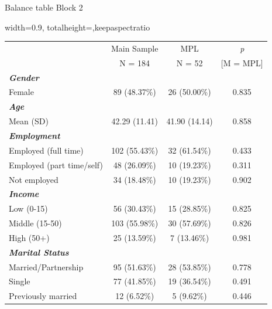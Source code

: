 \documentclass[aspectratio=169,xcolor=dvipsnames]{beamer}
\begin{document}
\begin{frame}{Balance table Block 2}
  \begin{table}
    \begin{adjustbox}{width=0.9\textwidth, totalheight=\baselineskip,keepaspectratio}
      \centering
      \begin{threeparttable}
        \begin{tabular*}{\textwidth}{@{\extracolsep{\fill}}lcc c@{}}
          \toprule
          & \multicolumn{1}{c}{Main Sample} & \multicolumn{1}{c}{MPL} & \multicolumn{1}{c}{\textit{p}} \\
          & \multicolumn{1}{c}{N = 184} & \multicolumn{1}{c}{N = 52} & [M = MPL]\\
          \midrule
          \textit{\textbf{Gender}} & & & \\
          Female & 89 (48.37\%) & 26 (50.00\%) & 0.835 \\ \midrule
          \textit{\textbf{Age}} & & & \\
          Mean (SD) & 42.29 (11.41) & 41.90 (14.14) & 0.858 \\ \midrule
          \textit{\textbf{Employment}} & & & \\
          Employed (full time) & 102 (55.43\%) & 32 (61.54\%) & 0.433 \\
          Employed (part time/self) & 48 (26.09\%) & 10 (19.23\%) & 0.311 \\
          Not employed & 34 (18.48\%) & 10 (19.23\%) & 0.902 \\ \midrule
          \textit{\textbf{Income}} & & & \\
          Low (0-15) & 56 (30.43\%) & 15 (28.85\%) & 0.825 \\
          Middle (15-50) & 103 (55.98\%) & 30 (57.69\%) & 0.826 \\
          High (50+) & 25 (13.59\%) & 7 (13.46\%) & 0.981 \\ \midrule
          \textit{\textbf{Marital Status}} & & & \\
          Married/Partnership & 95 (51.63\%) & 28 (53.85\%) & 0.778 \\
          Single & 77 (41.85\%) & 19 (36.54\%) & 0.491 \\
          Previously married & 12 (6.52\%) & 5 (9.62\%) & 0.446 \\
          \bottomrule
        \end{tabular*}
        \label{table3}
      \end{threeparttable}
    \end{adjustbox}
  \end{table}
\end{frame}
\end{document}
